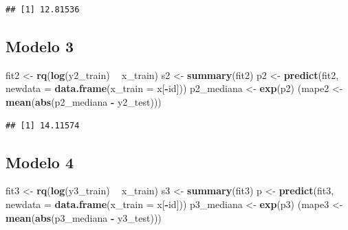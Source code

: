 \documentclass[]{article}
\newenvironment{Shaded}{\begin{snugshade}}{\end{snugshade}}
\newcommand{\KeywordTok}[1]{\textcolor[rgb]{0.13,0.29,0.53}{\textbf{#1}}}
\newcommand{\DataTypeTok}[1]{\textcolor[rgb]{0.13,0.29,0.53}{#1}}
\newcommand{\StringTok}[1]{\textcolor[rgb]{0.31,0.60,0.02}{#1}}
\newcommand{\OperatorTok}[1]{\textcolor[rgb]{0.81,0.36,0.00}{\textbf{#1}}}
\newcommand{\NormalTok}[1]{#1}
\begin{document}
\begin{verbatim}
## [1] 12.81536
\end{verbatim}

\subsection{Modelo 3}\label{modelo-3-2}

\begin{Shaded}
\begin{Highlighting}[]
\NormalTok{fit2 <-}\StringTok{ }\KeywordTok{rq}\NormalTok{(}\KeywordTok{log}\NormalTok{(y2_train) }\OperatorTok{~}\StringTok{ }\NormalTok{x_train)}
\NormalTok{s2 <-}\StringTok{ }\KeywordTok{summary}\NormalTok{(fit2)}
\NormalTok{p2 <-}\StringTok{ }\KeywordTok{predict}\NormalTok{(fit2, }\DataTypeTok{newdata =} \KeywordTok{data.frame}\NormalTok{(}\DataTypeTok{x_train =}\NormalTok{ x[}\OperatorTok{-}\NormalTok{id]))}
\NormalTok{p2_mediana <-}\StringTok{ }\KeywordTok{exp}\NormalTok{(p2)}
\NormalTok{(mape2 <-}\StringTok{ }\KeywordTok{mean}\NormalTok{(}\KeywordTok{abs}\NormalTok{(p2_mediana }\OperatorTok{-}\StringTok{ }\NormalTok{y2_test)))}
\end{Highlighting}
\end{Shaded}

\begin{verbatim}
## [1] 14.11574
\end{verbatim}

\subsection{Modelo 4}\label{modelo-4-2}

\begin{Shaded}
\begin{Highlighting}[]
\NormalTok{fit3 <-}\StringTok{ }\KeywordTok{rq}\NormalTok{(}\KeywordTok{log}\NormalTok{(y3_train) }\OperatorTok{~}\StringTok{ }\NormalTok{x_train)}
\NormalTok{s3 <-}\StringTok{ }\KeywordTok{summary}\NormalTok{(fit3)}
\NormalTok{p <-}\StringTok{ }\KeywordTok{predict}\NormalTok{(fit3, }\DataTypeTok{newdata =} \KeywordTok{data.frame}\NormalTok{(}\DataTypeTok{x_train =}\NormalTok{ x[}\OperatorTok{-}\NormalTok{id]))}
\NormalTok{p3_mediana <-}\StringTok{ }\KeywordTok{exp}\NormalTok{(p3)}
\NormalTok{(mape3 <-}\StringTok{ }\KeywordTok{mean}\NormalTok{(}\KeywordTok{abs}\NormalTok{(p3_mediana }\OperatorTok{-}\StringTok{ }\NormalTok{y3_test)))}
\end{Highlighting}
\end{Shaded}
\end{document}
